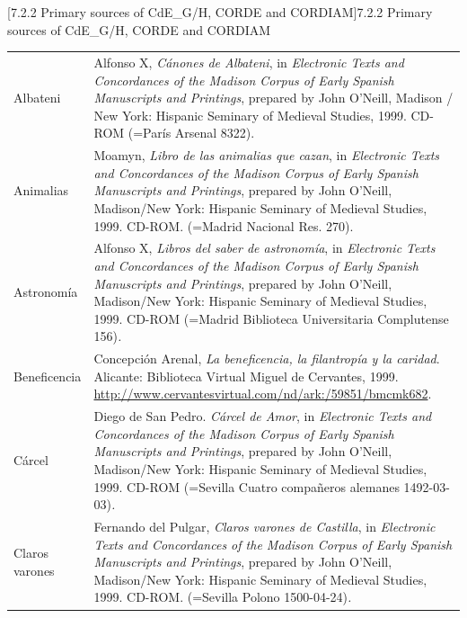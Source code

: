 \documentclass[10pt]{article}
\makeatletter
\renewcommand\subsubsection{\@startsection{subsubsection}{3}{0.0cm}{0in}{0.1mm}{\normalfont\normalsize\fontsize{12pt}{14.4pt}\selectfont}}
\makeatother
\begin{document}
\subsubsection[7.2.2 Primary sources of CdE\_G/H, CORDE and CORDIAM]{7.2.2 Primary sources of CdE\_G/H, CORDE and CORDIAM}
\begin{flushleft}
\tablefirsthead{}
\tablehead{}
\tabletail{}
\tablelasttail{}
\begin{supertabular}{m{1.7955599in}m{4.42126in}}
Albateni  &
Alfonso X, \textit{Cánones de Albateni}, in \textit{Electronic Texts and Concordances of the Madison Corpus of Early Spanish Manuscripts and Printings},\textit{ }prepared by John O’Neill, Madison / New York: Hispanic Seminary of Medieval Studies, 1999. CD-ROM (=París Arsenal 8322).\\
Animalias  &
Moamyn,\textit{ Libro de las animalias que cazan}, in \textit{Electronic Texts and Concordances of the Madison Corpus of Early Spanish Manuscripts and Printings},\textit{ }prepared by John O’Neill, Madison/New York: Hispanic Seminary of Medieval Studies, 1999. CD-ROM.\textit{ }(=Madrid Nacional Res. 270). \\
Astronomía  &
Alfonso X, \textit{Libros del saber de astronomía}, in \textit{Electronic Texts and Concordances of the Madison Corpus of Early Spanish Manuscripts and Printings},\textit{ }prepared by John O’Neill, Madison/New York: Hispanic Seminary of Medieval Studies, 1999. CD-ROM (=Madrid Biblioteca Universitaria Complutense 156)\textit{.}\\
Beneficencia  &
Concepción Arenal,\textit{ La beneficencia, la filantropía y la caridad}. Alicante: Biblioteca Virtual Miguel de Cervantes, 1999. \url{http://www.cervantesvirtual.com/nd/ark:/59851/bmcmk682}. \\
Cárcel\textit{ } &
Diego de San Pedro.\textit{ Cárcel de Amor}, in \textit{Electronic Texts and Concordances of the Madison Corpus of Early Spanish Manuscripts and Printings},\textit{ }prepared by John O’Neill, Madison/New York: Hispanic Seminary of Medieval Studies, 1999. CD-ROM (=Sevilla Cuatro compañeros alemanes 1492-03-03)\textit{.}\\
Claros varones\textit{ } &
Fernando del Pulgar, \textit{Claros varones de Castilla},\textit{ }in \textit{Electronic Texts and Concordances of the Madison Corpus of Early Spanish Manuscripts and Printings},\textit{ }prepared by John O’Neill, Madison/New York: Hispanic Seminary of Medieval Studies, 1999. CD-ROM. (=Sevilla Polono 1500-04-24)\textit{.}\\

\end{supertabular}
\end{flushleft}
\end{document}
